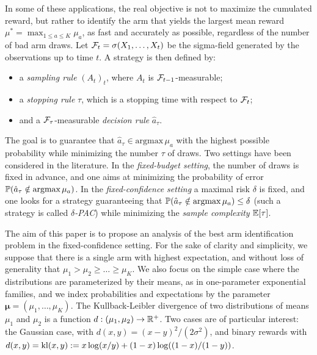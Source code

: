 \documentclass{colt2016} %
\begin{document}
In some of these applications, the real objective is not to maximize the cumulated reward, but rather to identify the arm that yields the largest mean reward $\mu^* = \max_{1\leq a\leq K}\mu_a$, as fast and accurately as possible, regardless of the number of bad arm draws. Let ${\cal F}_t=\sigma(X_1,\dots,X_t)$ be the sigma-field generated by the observations up to time $t$.  A strategy is then defined by:
\begin{itemize}[noitemsep,topsep=0pt,parsep=0pt,partopsep=0pt]
\item a \emph{sampling rule} $(A_t)_t$, where $A_t$ is ${\cal F}_{t-1}$-measurable;
\item a \emph{stopping rule} $\tau$, which is a stopping time with respect to ${\cal F}_t$;
\item and a ${\cal F}_{\tau}$-measurable \emph{decision rule} $\hat{a}_\tau$.
\end{itemize}
The goal is to guarantee that $\hat{a}_\tau\in\text{argmax}\, \mu_a$ with the highest possible probability while minimizing the number $\tau$ of draws.
Two settings have been considered in the literature. In the \emph{fixed-budget setting}, %
the number of draws is fixed in advance, and one aims at minimizing the probability of error $\mathbb{P}(\hat{a}_\tau\notin\text{argmax}\, \mu_a)$. In the \emph{fixed-confidence setting} %
a maximal risk $\delta$ is fixed, and one looks for a strategy guaranteeing that $\mathbb{P}(\hat{a}_\tau\notin\text{argmax}\, \mu_a) \leq \delta$ (such a strategy is called \emph{$\delta$-PAC}) while minimizing the \emph{sample complexity} $\mathbb{E}[\tau]$.

The aim of this paper is to propose an analysis of the best arm identification problem in the fixed-confidence setting. For the sake of clarity and simplicity, we suppose that there is a single arm with highest expectation, and without loss of generality that $\mu_1>\mu_2\geq\dots\geq \mu_K$.
We also focus on the simple case where the distributions are parameterized by their means, as in one-parameter exponential families, and we  index probabilities and expectations by the parameter ${\bm \mu}=(\mu_1,\dots,\mu_K)$. The Kullback-Leibler divergence of two distributions of means $\mu_1$ and $\mu_2$ is a function $d : (\mu_1,\mu_2)\to\mathbb{R}^+$. Two cases are of particular interest: the Gaussian case, with $d(x,y)=(x-y)^2/(2\sigma^2)$, and binary rewards with $d(x,y)=\mathrm{kl}(x,y):=x\log(x/y)+(1-x)\log((1-x)/(1-y))$.
\end{document}
